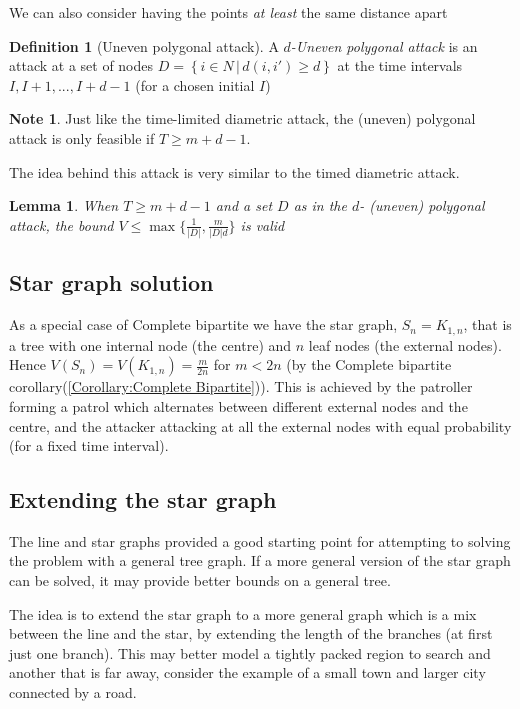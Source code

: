 \documentclass[a4paper,10pt]{article}
\newcommand{\set}[2]{\left\{ #1 \, | \, #2 \right\}}
\newtheorem{lemma}[theorem]{Lemma}
\theoremstyle{definition}
\newtheorem{definition}[theorem]{Definition}
\theoremstyle{definition}
\theoremstyle{remark}
\theoremstyle{definition}
\newtheorem*{note}{Note}
\begin{document}
We can also consider having the points \textit{at least} the same distance apart

\begin{definition}[Uneven polygonal attack]
A \textit{$d$-Uneven polygonal attack} is an attack at a set of nodes $D= \set{i \in N}{ d(i,i') \geq d}$ at the time intervals $I,I+1,...,I+d-1$ (for a chosen initial $I$)
\end{definition}

\begin{note}
Just like the time-limited diametric attack, the (uneven) polygonal attack is only feasible if $T \geq m+d-1$.
\end{note}

The idea behind this attack is very similar to the timed diametric attack.

\begin{lemma}
When $T \geq m+d-1$ and a set $D$ as in the $d$- (uneven) polygonal attack, the bound $V \leq \max \{ \frac{1}{|D|} , \frac{m}{|D|d} \}$ is valid
\end{lemma}


\subsection{Star graph solution}
As a special case of Complete bipartite we have the star graph, $S_{n}=K_{1,n}$, that is a tree with one internal node (the centre) and $n$ leaf nodes (the external nodes). Hence $V(S_{n})=V(K_{1,n})=\frac{m}{2n}$ for $m<2n$ (by the Complete bipartite corollary(\ref{Corollary:Complete Bipartite})). This is achieved by the patroller forming a patrol which alternates between different  external nodes and the centre, and the attacker attacking at all the external nodes with equal probability (for a fixed time interval).


\subsection{Extending the star graph}
The line and star graphs provided a good starting point for attempting to solving the problem with a general tree graph. If a more general version of the star graph can be solved, it may provide better bounds on a general tree. 

The idea is to extend the star graph to a more general graph which is a mix between the line and the star, by extending the length of the branches (at first just one branch). This may better model a tightly packed region to search and another that is far away, consider the example of a small town and larger city connected by a road. 
\end{document}
